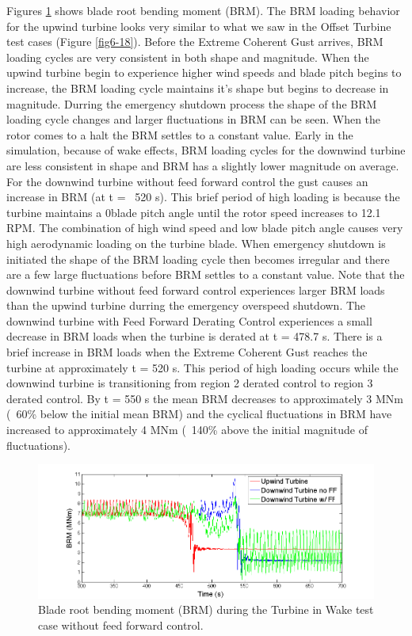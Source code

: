 Figures \ref{fig6-31} shows blade root bending moment (BRM). The BRM loading behavior for the upwind turbine looks very similar to what we saw in the Offset Turbine test cases (Figure \ref{fig6-18}). Before the Extreme Coherent Gust arrives, BRM loading cycles are very consistent in both shape and magnitude. When the upwind turbine begin to experience higher wind speeds and blade pitch begins to increase, the BRM loading cycle maintains it's shape but begins to decrease in magnitude. Durring the emergency shutdown process the shape of the BRM loading cycle changes and larger fluctuations in BRM can be seen. When the rotor comes to a halt the BRM settles to a constant value. Early in the simulation, because of wake effects, BRM loading cycles for the downwind turbine are less consistent in shape and BRM has a slightly lower magnitude on average. For the downwind turbine without feed forward control the gust causes an increase in BRM (at t = ~520 s). This brief period of high loading is because the turbine maintains a 0\degree blade pitch angle until the rotor speed increases to 12.1 RPM. The combination of high wind speed and low blade pitch angle causes very high aerodynamic loading on the turbine blade. When emergency shutdown is initiated the shape of the BRM loading cycle then becomes irregular and there are a few large fluctuations before BRM settles to a constant value. Note that the downwind turbine without feed forward control experiences larger BRM loads than the upwind turbine durring the emergency overspeed shutdown. The downwind turbine with Feed Forward Derating Control experiences a small decrease in BRM loads when the turbine is derated at t = 478.7 s. There is a brief increase in BRM loads when the Extreme Coherent Gust reaches the turbine at approximately t = 520 s. This period of high loading occurs while the downwind turbine is transitioning from region 2 derated control to region 3 derated control. By t = 550 s the mean BRM decreases to approximately 3 MNm (~60\% below the initial mean BRM) and the cyclical fluctuations in BRM have increased to approximately 4 MNm (~140\% above the initial magnitude of fluctuations).

\begin{figure}[!htbp] 
	\centering
		\includegraphics[width = \linewidth]{Figures/ch6Figures/fig6-31.png}

	\caption{Blade root bending moment (BRM) during the Turbine in Wake test case without feed forward control.}
	\label{fig6-31}
\end{figure}

